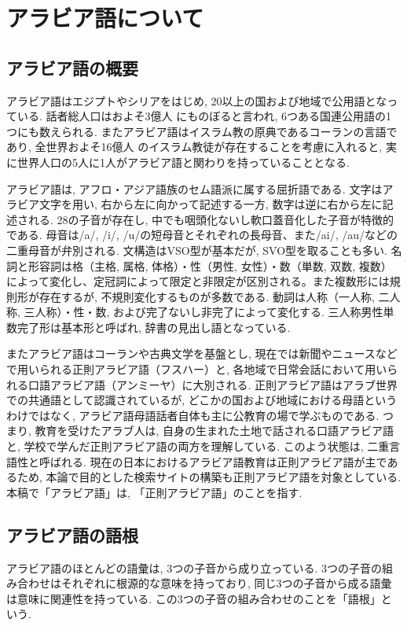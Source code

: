 \documentclass[technicalreport]{ieicej}
\begin{document}
\section{アラビア語について}
\subsection{アラビア語の概要}
アラビア語はエジプトやシリアをはじめ, 20以上の国および地域で公用語となっている. 話者総人口はおよそ3億人 にものぼると言われ, 6つある国連公用語の1つにも数えられる. またアラビア語はイスラム教の原典であるコーランの言語であり, 全世界およそ16億人 のイスラム教徒が存在することを考慮に入れると, 実に世界人口の5人に1人がアラビア語と関わりを持っていることとなる. 

アラビア語は, アフロ・アジア語族のセム語派に属する屈折語である. 文字はアラビア文字を用い, 右から左に向かって記述する一方, 数字は逆に右から左に記述される. 28の子音が存在し, 中でも咽頭化ないし軟口蓋音化した子音が特徴的である. 母音は/a/, /i/, /u/の短母音とそれぞれの長母音、また/ai/, /au/などの二重母音が弁別される. 文構造はVSO型が基本だが, SVO型を取ることも多い. 名詞と形容詞は格（主格, 属格, 体格）・性（男性, 女性）・数（単数, 双数, 複数）によって変化し、定冠詞によって限定と非限定が区別される。また複数形には規則形が存在するが, 不規則変化するものが多数である. 動詞は人称（一人称, 二人称, 三人称）・性・数, および完了ないし非完了によって変化する. 三人称男性単数完了形は基本形と呼ばれ, 辞書の見出し語となっている.

またアラビア語はコーランや古典文学を基盤とし, 現在では新聞やニュースなどで用いられる正則アラビア語（フスハー）と, 各地域で日常会話において用いられる口語アラビア語（アンミーヤ）に大別される. 正則アラビア語はアラブ世界での共通語として認識されているが, どこかの国および地域における母語というわけではなく, アラビア語母語話者自体も主に公教育の場で学ぶものである. つまり, 教育を受けたアラブ人は, 自身の生まれた土地で話される口語アラビア語と, 学校で学んだ正則アラビア語の両方を理解している. このよう状態は, 二重言語性と呼ばれる. 現在の日本におけるアラビア語教育は正則アラビア語が主であるため, 本論で目的とした検索サイトの構築も正則アラビア語を対象としている. 本稿で「アラビア語」は, 「正則アラビア語」のことを指す. 

\subsection{アラビア語の語根}
アラビア語のほとんどの語彙は, 3つの子音から成り立っている. 3つの子音の組み合わせはそれぞれに根源的な意味を持っており, 同じ3つの子音から成る語彙は意味に関連性を持っている. この3つの子音の組み合わせのことを「語根」という. 
\end{document}
